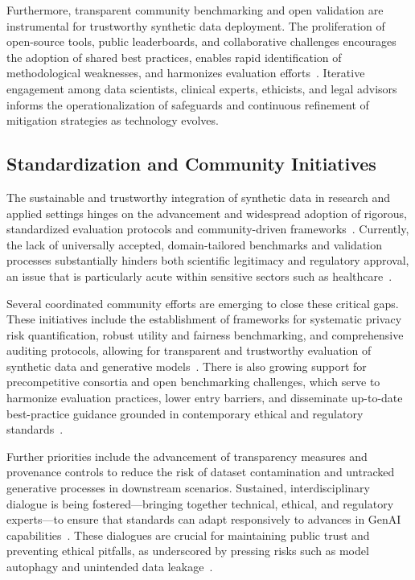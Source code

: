\documentclass[sigconf]{acmart}
\begin{document}
Furthermore, transparent community benchmarking and open validation are instrumental for trustworthy synthetic data deployment. The proliferation of open-source tools, public leaderboards, and collaborative challenges encourages the adoption of shared best practices, enables rapid identification of methodological weaknesses, and harmonizes evaluation efforts~\cite{ref82}\cite{ref88}\cite{ref89}. Iterative engagement among data scientists, clinical experts, ethicists, and legal advisors informs the operationalization of safeguards and continuous refinement of mitigation strategies as technology evolves.

\subsection{Standardization and Community Initiatives}

The sustainable and trustworthy integration of synthetic data in research and applied settings hinges on the advancement and widespread adoption of rigorous, standardized evaluation protocols and community-driven frameworks~\cite{ref88}\cite{ref89}. Currently, the lack of universally accepted, domain-tailored benchmarks and validation processes substantially hinders both scientific legitimacy and regulatory approval, an issue that is particularly acute within sensitive sectors such as healthcare~\cite{ref6}\cite{ref7}\cite{ref88}\cite{ref89}.

Several coordinated community efforts are emerging to close these critical gaps. These initiatives include the establishment of frameworks for systematic privacy risk quantification, robust utility and fairness benchmarking, and comprehensive auditing protocols, allowing for transparent and trustworthy evaluation of synthetic data and generative models~\cite{ref81}\cite{ref82}\cite{ref88}\cite{ref89}. There is also growing support for precompetitive consortia and open benchmarking challenges, which serve to harmonize evaluation practices, lower entry barriers, and disseminate up-to-date best-practice guidance grounded in contemporary ethical and regulatory standards~\cite{ref89}.

Further priorities include the advancement of transparency measures and provenance controls to reduce the risk of dataset contamination and untracked generative processes in downstream scenarios. Sustained, interdisciplinary dialogue is being fostered—bringing together technical, ethical, and regulatory experts—to ensure that standards can adapt responsively to advances in GenAI capabilities~\cite{ref60}\cite{ref75}\cite{ref81}\cite{ref88}. These dialogues are crucial for maintaining public trust and preventing ethical pitfalls, as underscored by pressing risks such as model autophagy and unintended data leakage~\cite{ref7}\cite{ref82}.
\end{document}
